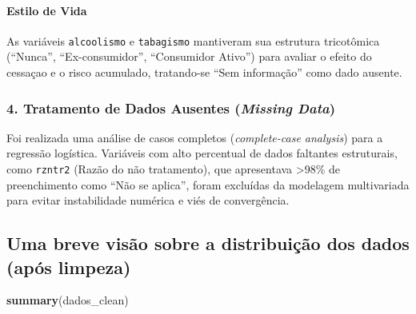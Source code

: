 \documentclass[
]{article}
\newenvironment{Shaded}{\begin{snugshade}}{\end{snugshade}}
\newcommand{\FunctionTok}[1]{\textcolor[rgb]{0.13,0.29,0.53}{\textbf{#1}}}
\newcommand{\NormalTok}[1]{#1}
\begin{document}
\paragraph{Estilo de Vida}\label{estilo-de-vida}

As variáveis \texttt{alcoolismo} e \texttt{tabagismo} mantiveram sua
estrutura tricotômica (``Nunca'', ``Ex-consumidor'', ``Consumidor
Ativo'') para avaliar o efeito do cessaçao e o risco acumulado,
tratando-se ``Sem informação'' como dado ausente.

\subsubsection{\texorpdfstring{4. Tratamento de Dados Ausentes
(\emph{Missing
Data})}{4. Tratamento de Dados Ausentes (Missing Data)}}\label{tratamento-de-dados-ausentes-missing-data}

Foi realizada uma análise de casos completos (\emph{complete-case
analysis}) para a regressão logística. Variáveis com alto percentual de
dados faltantes estruturais, como \texttt{rzntr2} (Razão do não
tratamento), que apresentava \textgreater98\% de preenchimento como
``Não se aplica'', foram excluídas da modelagem multivariada para evitar
instabilidade numérica e viés de convergência.

\subsection{Uma breve visão sobre a distribuição dos dados (após
limpeza)}\label{uma-breve-visuxe3o-sobre-a-distribuiuxe7uxe3o-dos-dados-apuxf3s-limpeza}

\begin{Shaded}
\begin{Highlighting}[]
\FunctionTok{summary}\NormalTok{(dados\_clean)}
\end{Highlighting}
\end{Shaded}
\end{document}
